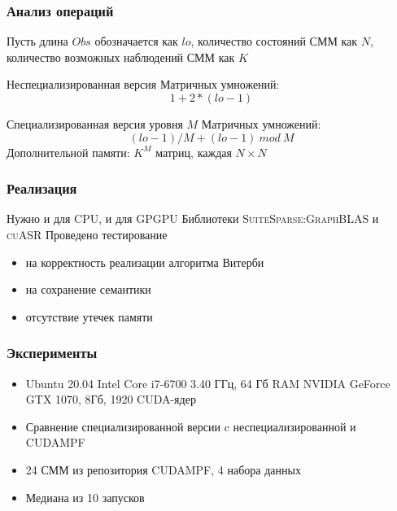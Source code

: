 \documentclass{beamer}
\newcommand\name[1]{\textsc{#1}}
\begin{document}
\begin{frame}[fragile]
	\frametitle{Анализ операций}
	Пусть длина $\mathit{Obs}$ обозначается как $lo$, количество состояний СММ как $N$, количество возможных наблюдений СММ как $K$
	\vfill
	\begin{block}{Неспециализированная версия}
		Матричных умножений: \[1 + 2 \ast (\mathit{lo} - 1)\]
	\end{block}
	\vfill
	\begin{block}{Специализированная версия уровня $M$}
		Матричных умножений: \[\mathit{(lo - 1) / M + (lo - 1)\ mod\ M}\]
		Дополнительной памяти: $\mathit{K^{M}}$ матриц, каждая $N \times N$ 
	\end{block}
	
\end{frame}


\begin{frame}[fragile]
	\frametitle{Реализация}
Нужно и для CPU, и для GPGPU
	\vfill
	Библиотеки \name{SuiteSparse:GraphBLAS} и \name{cuASR}
	\vfill
	Проведено тестирование
	\begin{itemize}
		\item на корректность реализации алгоритма Витерби
		\item на сохранение семантики
		\item отсутствие утечек памяти
	\end{itemize}
\end{frame}


\begin{frame}[fragile]
	\frametitle{Эксперименты}
	\begin{itemize}	
		\item Ubuntu 20.04 \newline Intel Core i7-6700 3.40 
ГГц, 64 Гб RAM \newline NVIDIA GeForce GTX 1070, 8Гб, 1920 CUDA-ядер
		\vfill
		\item Сравнение специализированной версии c неспециализированной и \name{CUDAMPF}
		\vfill
		\item 24 СММ из репозитория \name{CUDAMPF}, 4 набора данных
		\vfill 
		\item Медиана из 10 запусков
	\end{itemize}
\end{frame}
\end{document}
